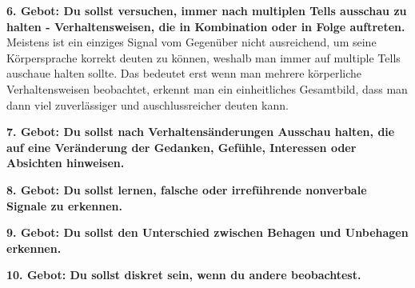 \par\textbf{6. Gebot: Du sollst versuchen, immer nach multiplen Tells ausschau zu halten - Verhaltensweisen, die in Kombination oder in Folge auftreten.}
Meistens ist ein einziges Signal vom Gegenüber nicht ausreichend, um seine Körpersprache korrekt deuten zu können, 
weshalb man immer auf multiple Tells auschaue halten sollte. Das bedeutet erst wenn man mehrere körperliche Verhaltensweisen beobachtet, erkennt man 
ein einheitliches Gesamtbild, dass man dann viel zuverlässiger und auschlussreicher deuten kann.

\par\textbf{7. Gebot: Du sollst nach Verhaltensänderungen Ausschau halten, die auf eine Veränderung der Gedanken, Gefühle, Interessen oder Absichten hinweisen.}

 


\par\textbf{8. Gebot: Du sollst lernen, falsche oder irreführende nonverbale Signale zu erkennen.}
\par\textbf{9. Gebot: Du sollst den Unterschied zwischen Behagen und Unbehagen erkennen.}
\par\textbf{10. Gebot: Du sollst diskret sein, wenn du andere beobachtest.}
